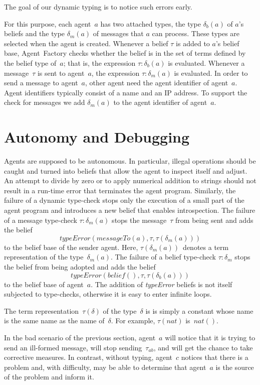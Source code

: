 \documentclass{aamas2012} %
\theoremstyle{remark}
\begin{document}
The goal of our dynamic typing is to notice such errors early.

For this purpose, each agent~$a$ has two attached types, the type
$\delta_b(a)$ of $a$'s beliefs and the type $\delta_m(a)$ of messages that
$a$ can process. These types are selected when the agent is created.
Whenever a belief $\tau$ is added to $a$'s belief base, Agent~Factory
checks whether the belief is in the set of terms defined by the belief type
of~$a$; that is, the expression $\tau:\delta_b(a)$ is evaluated. Whenever a
message~$\tau$ is sent to agent~$a$, the expression $\tau:\delta_m(a)$ is
evaluated. In order to send a message to agent~$a$, other agent need the
agent identifier of agent~$a$. Agent identifiers typically consist of a
name and an IP address. To support the check for messages we add
$\delta_m(a)$ to the agent identifier of agent~$a$.

\section{Autonomy and Debugging} \label{sec:bugs} %

Agents are supposed to be autonomous. In particular, illegal operations
should be caught and turned into beliefs that allow the agent to inspect
itself and adjust. An attempt to divide by zero or to apply numerical
addition to strings should not result in a run-time error that terminates
the agent program. Similarly, the failure of a dynamic type-check stops
only the execution of a small part of the agent program and introduces a
new belief that enables introspection. The failure of a message type-check
$\tau:\delta_m(a)$ stops the message~$\tau$ from being sent and adds the
belief \[\mathit{typeError}(\mathit{messageTo}(a), \tau, \tau(\delta_m(a)))
\] to the belief base of the sender agent. Here,
$\tau(\delta_m(a))$~denotes a term representation of the
type~$\delta_m(a)$.  The failure of a belief type-check $\tau:\delta_m$
stops the belief from being adopted and adds the belief
\[\mathit{typeError}(\mathit{belief}(), \tau, \tau(\delta_b(a))) \] to the
belief base of agent~$a$. The addition of \textit{typeError} beliefs is not
itself subjected to type-checks, otherwise it is easy to enter infinite
loops.

The term representation~$\tau(\delta)$ of the type~$\delta$ is is simply a
constant whose name is the same name as the name of~$\delta$. For example,
$\tau(\mathit{nat})$ is~$\mathit{nat}()$.

In the bad scenario of the previous section, agent~$a$ will notice that it
is trying to send an ill-formed message, will stop sending~$\tau_{ab}$, and
will get the chance to take corrective measures. In contrast, without
typing, agent~$c$ notices that there is a problem and, with difficulty, may
be able to determine that agent~$a$ is the source of the problem and inform
it.
\end{document}
